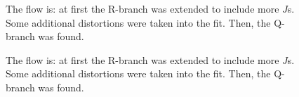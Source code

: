\documentclass[11pt]{article}
\begin{document}
\begin{figure}
\caption{\small The flow is: at first the R-branch was extended to include more $J$s. Some additional distortions were taken into the fit. Then, the Q-branch was found. }
\label{fig:vin_analytics_5}
\end{figure}


\begin{figure}
\caption{\small The flow is: at first the R-branch was extended to include more $J$s. Some additional distortions were taken into the fit. Then, the Q-branch was found. }
\label{fig:vin_analytics_6}
\end{figure}



\end{document}
